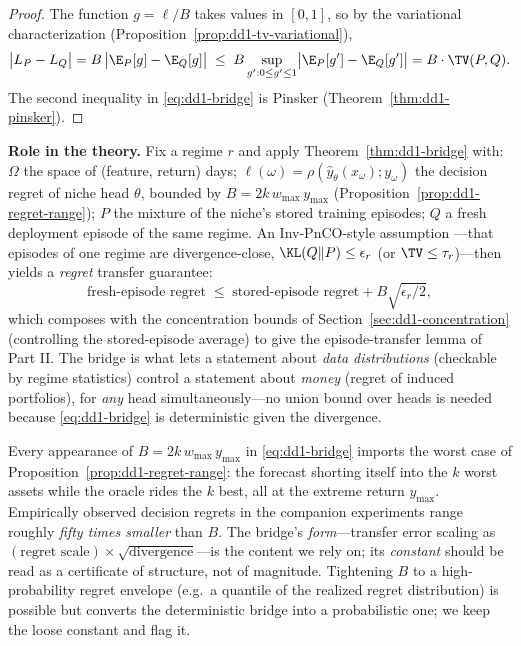 \begin{proof}
The function $g = \ell / B$ takes values in $[0, 1]$, so by the variational
characterization (Proposition~\ref{prop:dd1-tv-variational}),
\[
\bigl| L_P - L_Q \bigr| = B \,\bigl| \E_P[g] - \E_Q[g] \bigr|
\;\le\; B \sup_{g' : 0 \le g' \le 1} \bigl| \E_P[g'] - \E_Q[g'] \bigr|
= B \cdot \TV(P, Q).
\]
The second inequality in \eqref{eq:dd1-bridge} is Pinsker
(Theorem~\ref{thm:dd1-pinsker}).
\end{proof}

\begin{keypoint}
\textbf{Role in the \nm{} theory.} Fix a regime $r$ and apply
Theorem~\ref{thm:dd1-bridge} with: $\Omega$ the space of (feature, return)
days; $\ell(\omega) = \rho(\hat{y}_\theta(x_\omega); y_\omega)$ the decision
regret of niche head $\theta$, bounded by $B = 2 k\, w_{\max}\, y_{\max}$
(Proposition~\ref{prop:dd1-regret-range}); $P$ the mixture of the niche's
stored training episodes; $Q$ a fresh deployment episode of the same regime.
An Inv-PnCO-style assumption \cite{yan2026invpnco}---that episodes of one
regime are divergence-close, $\KL(Q \| P) \le \epsilon_r$ (or
$\TV \le \tau_r$)---then yields a \emph{regret} transfer guarantee:
\[
\text{fresh-episode regret}
\;\le\; \text{stored-episode regret} + B\sqrt{\epsilon_r / 2},
\]
which composes with the concentration bounds of
Section~\ref{sec:dd1-concentration} (controlling the stored-episode average)
to give the episode-transfer lemma of Part II. The bridge is what lets a
statement about \emph{data distributions} (checkable by regime statistics)
control a statement about \emph{money} (regret of induced portfolios), for
\emph{any} head simultaneously---no union bound over heads is needed because
\eqref{eq:dd1-bridge} is deterministic given the divergence.
\end{keypoint}

\begin{remark}
\label{rem:dd1-B-loose}
Every appearance of $B = 2 k\, w_{\max}\, y_{\max}$ in
\eqref{eq:dd1-bridge} imports the worst case of
Proposition~\ref{prop:dd1-regret-range}: the forecast shorting itself into
the $k$ worst assets while the oracle rides the $k$ best, all at the extreme
return $y_{\max}$. Empirically observed decision regrets in the companion
experiments range roughly \emph{fifty times smaller} than $B$. The bridge's
\emph{form}---transfer error scaling as
$(\text{regret scale}) \times \sqrt{\text{divergence}}$---is the content we
rely on; its \emph{constant} should be read as a certificate of structure,
not of magnitude. Tightening $B$ to a high-probability regret envelope (e.g.\
a quantile of the realized regret distribution) is possible but converts the
deterministic bridge into a probabilistic one; we keep the loose constant and
flag it.
\end{remark}

